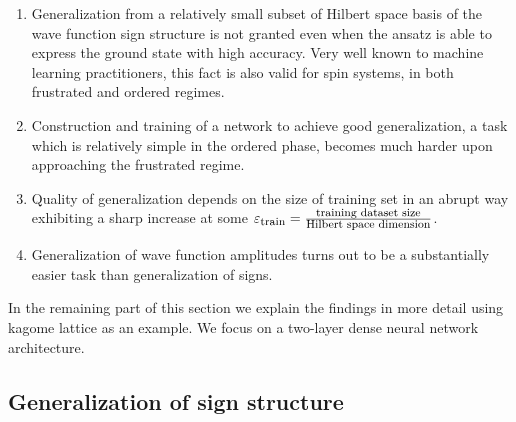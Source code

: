 \begin{enumerate}[topsep=0pt, noitemsep]
    \item \label{i:nc20:1} Generalization from a relatively small subset of Hilbert space basis of the wave function sign structure is not granted even when the ansatz is able to express the ground state with high accuracy. Very well known to machine learning practitioners, this fact is also valid for spin systems, in both frustrated and ordered regimes.
    \item \label{i:nc20:2} Construction and training of a network to achieve good generalization, a task which is relatively simple in the ordered phase, becomes much harder upon approaching the frustrated regime.
    \item \label{i:nc20:3} Quality of generalization depends on the size of training set in an abrupt way exhibiting a sharp increase at some $\varepsilon_{\mbox{\footnotesize train}}=\frac{\mbox{\footnotesize training dataset size}}{\mbox{\footnotesize Hilbert space dimension}}$. 
    \item \label{i:nc20:4} Generalization of wave function amplitudes turns out to be a substantially easier task than generalization of signs.
\end{enumerate}

In the remaining part of this section we explain the findings in more detail using kagome lattice as an example. We focus on a two-layer dense neural network architecture.

\subsection{Generalization of sign structure}

